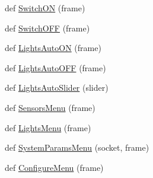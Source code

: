 \begin{DoxyCompactItemize}
def \hyperlink{namespaceSensorNode_aba7501484cafdf93d218f4001f7bf27d}{Switch\+ON} (frame)
\item 
def \hyperlink{namespaceSensorNode_a4e68f587234ab5538cf224a8dadb3372}{Switch\+O\+FF} (frame)
\item 
def \hyperlink{namespaceSensorNode_aee31952b7d1ad370726caed32875d4e6}{Lights\+Auto\+ON} (frame)
\item 
def \hyperlink{namespaceSensorNode_a03916abb4a46a2aad0d0df685d84c57d}{Lights\+Auto\+O\+FF} (frame)
\item 
def \hyperlink{namespaceSensorNode_a107274f5d5053c3fbd95721de6abe6f3}{Lights\+Auto\+Slider} (slider)
\item 
def \hyperlink{namespaceSensorNode_ae26984e25b77f3e5b585c426be132ea8}{Sensors\+Menu} (frame)
\item 
def \hyperlink{namespaceSensorNode_ae3b811b5d3e85d5e05e233fe44af8b95}{Lights\+Menu} (frame)
\item 
def \hyperlink{namespaceSensorNode_ac79d5de3c8c949900e790e0bdc1eb436}{System\+Params\+Menu} (socket, frame)
\item 
def \hyperlink{namespaceSensorNode_a3c64dd19370abacb4a0fe7d899f94f18}{Configure\+Menu} (frame)
\end{DoxyCompactItemize}
